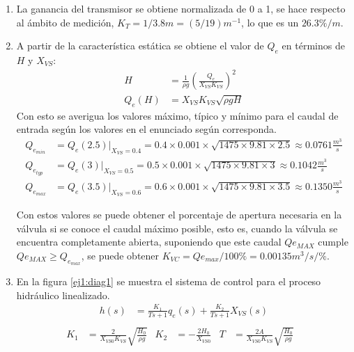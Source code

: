 \begin{ejercicio}

  \begin{enumerate}
    \item %
    La ganancia del transmisor se obtiene normalizada de 0 a 1, se hace respecto al ámbito de medición, $K_T = 1/3.8m = (5/19)m^{-1}$, lo que es un $26.3\%/m$.

    \item %
    A partir de la característica estática se obtiene el valor de $Q_e$ en términos de $H$ y $X_{VS}$:
    \begin{align*}
    \tag{Característica Estática}
    H &=\frac{1}{\rho g} \left( \frac{Q_e}{X_{VS}K_{VS}} \right)^2
    \\
    Q_e(H) &= X_{VS} K_{VS}\sqrt{\rho g H}
    \end{align*}
    Con esto se averigua los valores máximo, típico y mínimo para el caudal de entrada según los valores en el enunciado según corresponda.
    \begin{align*}
    Q_{e_{min}} &= Q_{e}(2.5)|_{X_{VS}=0.4} = 0.4 \times 0.001 \times \sqrt{1475\times9.81\times2.5} \approx 0.0761 \frac{m^3}{s}
    \\
    Q_{e_{typ}} &= Q_{e}(3)|_{X_{VS}=0.5} = 0.5 \times 0.001 \times \sqrt{1475\times9.81\times3} \approx 0.1042 \frac{m^3}{s}
    \\
    Q_{e_{max}} &= Q_{e}(3.5)|_{X_{VS}=0.6} = 0.6 \times 0.001 \times \sqrt{1475\times9.81\times3.5} \approx 0.1350 \frac{m^3}{s}
    \end{align*}

    Con estos valores se puede obtener el porcentaje de apertura necesaria en la válvula si se conoce el caudal máximo posible, esto es, cuando la válvula se encuentra completamente abierta, suponiendo que este caudal $Q{e_{MAX}}$ cumple $Q{e_{MAX}} \geq Q_{e_{max}}$, se puede obtener $K_{VC}=Q{e_{max}}/100\%=0.00135m^3/s/\%$.

    \item %
    En la figura \ref{ej1:diag1} se muestra el sistema de control para el proceso hidráulico linealizado.
    \begin{align*}
      \tag{Modelo linealizado}
      h(s) &= \frac{K_1}{Ts + 1}q_e(s) + \frac{K_2}{Ts + 1}X_{VS}(s)\\
    \end{align*}
    \begin{align*}
      K_1 &= \frac{2}{X_{VS0} K_{VS}}\sqrt{\frac{H_0}{\rho g}} &
      K_2 &= -\frac{2H_0}{X_{VS0}} &
      T &= \frac{2A}{X_{VS0} K_{VS}}\sqrt{\frac{H_0}{\rho g}} &
    \end{align*}


\end{enumerate}
\end{ejercicio}
